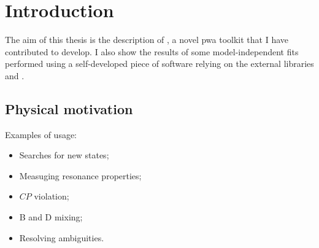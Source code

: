 \chapter{Introduction}

    The aim of this thesis is the description of , a novel \ac{pwa} toolkit that I have contributed to develop.
    I also show the results of some model-independent fits performed using a self-developed piece of software relying on the external libraries  and .

    \section{Physical motivation}

    Examples of usage:
    \begin{itemize}
        \item Searches for new states;
        \item Measuging resonance properties;
        \item $CP$ violation;
        \item B and D mixing;
        \item Resolving ambiguities.
    \end{itemize}
